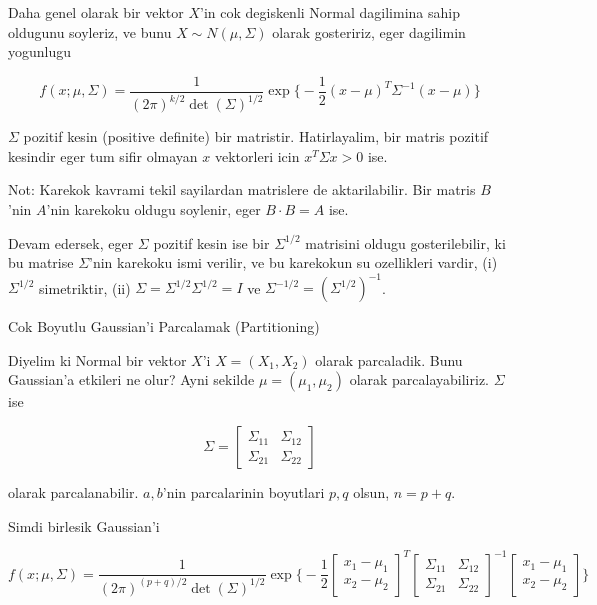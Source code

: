 \documentclass[12pt,fleqn]{article}\usepackage{../common}
\begin{document}
Daha genel olarak bir vektor $X$'in cok degiskenli Normal dagilimina sahip
oldugunu soyleriz, ve bunu $X \sim N(\mu,\Sigma)$ olarak gosteririz, eger
dagilimin yogunlugu 

\[ f(x;\mu,\Sigma) = 
\frac{ 1}{(2\pi)^{k/2} \det(\Sigma)^{1/2}} \exp 
\bigg\{ 
-\frac{ 1}{2}(x-\mu)^T\Sigma^{-1}(x-\mu)
\bigg\}
 \]

$\Sigma$ pozitif kesin (positive definite) bir matristir. Hatirlayalim, bir matris
pozitif kesindir eger tum sifir olmayan $x$ vektorleri icin $x^T\Sigma x >
0$ ise. 

Not: Karekok kavrami tekil sayilardan matrislere de aktarilabilir. Bir
matris $B$'nin $A$'nin karekoku oldugu soylenir, eger $B \cdot B = A$ ise.

Devam edersek, eger $\Sigma$ pozitif kesin ise bir $\Sigma^{1/2}$ matrisini
oldugu gosterilebilir, ki bu matrise $\Sigma$'nin karekoku ismi verilir, ve
bu karekokun su ozellikleri vardir, (i)  $\Sigma^{1/2}$ simetriktir, (ii)
$\Sigma =  \Sigma^{1/2}\Sigma^{1/2} = I$ ve $\Sigma^{-1/2} =
(\Sigma^{1/2})^{-1}$. 

Cok Boyutlu Gaussian'i Parcalamak (Partitioning)

Diyelim ki Normal bir vektor $X$'i $X = (X_1,X_2)$ olarak parcaladik. Bunu
Gaussian'a etkileri ne olur? Ayni sekilde $\mu = (\mu_1,\mu_2)$ olarak
parcalayabiliriz. $\Sigma$ ise

\[ \Sigma = 
\left[\begin{array}{rr}
\Sigma_{11} & \Sigma_{12}\\
\Sigma_{21} & \Sigma_{22}
\end{array}\right]
 \]

olarak parcalanabilir. $a,b$'nin parcalarinin boyutlari $p,q$ olsun, $n =
p+q$.

Simdi birlesik Gaussian'i 

\[ f(x;\mu,\Sigma) = 
\frac{ 1}{(2\pi)^{(p+q)/2} \det(\Sigma)^{1/2}} 
\exp 
\bigg\{ 
-\frac{ 1}{2}
\left[\begin{array}{r}
x_1 - \mu_1\\
x_2 - \mu_2
\end{array}\right]^T
\left[\begin{array}{rr}
\Sigma_{11} & \Sigma_{12}\\
\Sigma_{21} & \Sigma_{22}
\end{array}\right]^{-1}
\left[\begin{array}{r}
x_1 - \mu_1\\
x_2 - \mu_2
\end{array}\right]
\bigg\}
 \]
\end{document}
